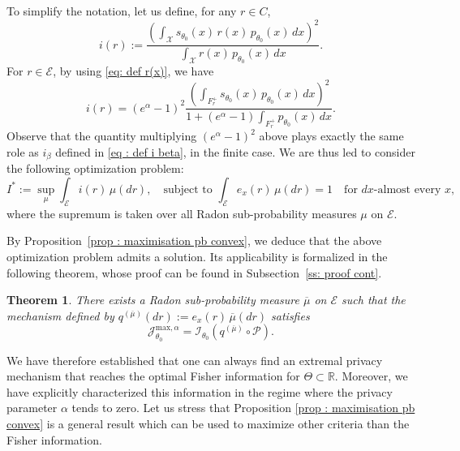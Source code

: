 \documentclass[a4paper, 11pt]{article}
\newtheorem{thm}{Theorem}
\theoremstyle{definition}
\newcommand{\cE}{{\mathcal{E}}}
\newcommand{\cI}{{\mathcal{I}}}
\newcommand{\cJ}{{\mathcal{J}}}
\newcommand{\cP}{{\mathcal{P}}}
\newcommand{\cX}{{\mathcal{X}}}
\newcommand{\theconvex}{C}
\newcommand{\arnaud}[1]{\todo[color=green!20]{{ #1}}}
\begin{document}
{To simplify the notation, let us define, for any $r \in \theconvex$,
\begin{equation} \label{eq : def i r ctn convex}
	i(r) := \frac{ \left( \int_\cX  s_{\theta_0}(x) \, r(x) \, p_{\theta_0}(x) \, dx \right)^2 }{
		\int_{\cX} r(x) \, p_{\theta_0}(x) \, dx } .
\end{equation}
For $r \in \cE$, by using  \eqref{eq: def r(x)}, we have
\begin{equation}		\label{eq : def i r ctn extremal}
	i(r)	= (e^\alpha - 1)^2 \frac{ \left( \int_{F_r^+}  s_{\theta_0}(x) \, p_{\theta_0}(x) \, dx \right)^2 }{ 1 + (e^\alpha - 1)
		\int_{F_{r}^+} p_{\theta_0}(x) \, dx }.
\end{equation}
 Observe that the quantity multiplying \( (e^\alpha - 1)^2 \) above plays exactly the same role as \( i_\beta \) defined in \eqref{eq : def i beta}, in the finite case.
We are thus led to consider the following optimization problem:
\begin{equation} \label{eq : optimisation pb ctn}
	I^* := \sup_{\mu} \int_\cE i(r) \, \mu(dr), \quad
	\text{subject to } \int_\cE e_x(r) \, \mu(dr) = 1 \quad \text{for $dx$-almost every } x,
\end{equation}
where the supremum is taken over all Radon sub-probability measures $\mu$ on $\cE$.

By Proposition~\ref{prop : maximisation pb convex}, we deduce that the above optimization problem admits a solution. Its applicability is formalized in the following theorem, whose proof can be found in Subsection~\ref{ss: proof cont}. 

\begin{thm}{\label{thm: main opt cont}}
There exists a Radon sub-probability measure $\overline{\mu}$ on $\cE$ such that the mechanism defined by $q^{(\overline{\mu})}(dr) := e_x(r) \, \overline{\mu}(dr)$ satisfies
\begin{equation*}
	\cJ^{\text{max},\alpha}_{\theta_0} = \cI_{\theta_0}\left( q^{(\overline{\mu})} \circ \cP \right).
\end{equation*}
\end{thm}
We have therefore established that one can always find an extremal privacy mechanism that reaches the optimal Fisher information for $\Theta \subset \mathbb{R}$. Moreover, we have explicitly characterized this information in the regime where the privacy parameter $\alpha$ tends to zero. Let us stress that Proposition \ref{prop : maximisation pb convex} is a general result which can be used to maximize other criteria than the Fisher information. 


}
\end{document}
